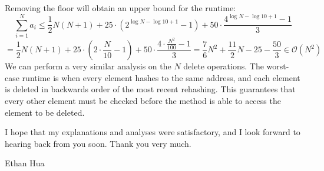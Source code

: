\documentclass[11pt]{article}
\begin{document}
    Removing the floor will obtain an upper bound for the runtime:
    \[
        \sum_{i=1}^{N} a_i \leq \frac{1}{2}N(N+1)+25 \cdot (2^{\log N - \log 10 + 1} - 1) + 50 \cdot \frac{4^{\log N - \log 10 + 1} - 1}{3}
    \]
    \[
        = \frac{1}{2}N(N+1)+25 \cdot \left(2 \cdot \frac{N}{10} - 1\right) + 50 \cdot \frac{4 \cdot \frac{N^2}{100} - 1}{3} = \frac{7}{6}N^2 + \frac{11}{2}N - 25 - \frac{50}{3} \in \mathcal{O} (N^2)
    \]
    We can perform a very similar analysis on the \(N\) delete operations. The worst-case runtime is when every element hashes to the same address, and each element is deleted in backwards order of the most recent rehashing. This guarantees that every other element must be checked before the method is able to access the element to be deleted.
    
    I hope that my explanations and analyses were satisfactory, and I look forward to hearing back from you soon. Thank you very much.

    \medskip

    Ethan Hua
\end{document}
